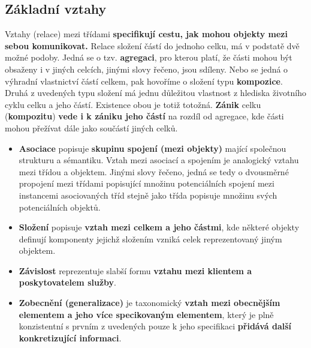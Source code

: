 \subsection{Základní vztahy}
Vztahy (relace) mezi třídami \textbf{specifikují cestu, jak mohou objekty mezi sebou komunikovat.} Relace složení částí do jednoho celku, má v podstatě dvě možné podoby.  Jedná se  o tzv. \textbf{agregaci}, pro kterou platí, že části mohou být obsaženy i v jiných celcích, jinými slovy řečeno, jsou sdíleny.  Nebo se jedná o výhradní vlastnictví částí celkem, pak hovoříme o  složení typu \textbf{kompozice}.  Druhá z uvedených typu složení má jednu důležitou vlastnost  z hlediska životního cyklu celku a jeho částí.  Existence obou je totiž totožná.  \textbf{Zánik} celku  (\textbf{kompozitu}) \textbf{vede i k zániku jeho částí} na rozdíl od agregace, kde části mohou přežívat dále jako součástí jiných celků.
\begin{itemize}
\item \textbf{Asociace} popisuje\textbf{ skupinu spojení (mezi objekty)} mající společnou strukturu a sémantiku. Vztah mezi asociací a spojením je analogický vztahu mezi třídou a objektem. Jinými slovy řečeno, jedná se tedy o dvousměrné propojení mezi třídami popisující množinu potenciálních spojení mezi instancemi asociovaných tříd stejně jako třída popisuje množinu svých potenciálních objektů.
\item \textbf{Složení} popisuje \textbf{vztah mezi celkem a jeho částmi}, kde některé objekty definují komponenty jejichž složením vzniká celek reprezentovaný jiným objektem.
\item \textbf{Závislost} reprezentuje slabší formu \textbf{vztahu mezi klientem a poskytovatelem služby}.
\item \textbf{Zobecnění (generalizace)} je taxonomický \textbf{vztah mezi obecnějším elementem a jeho více specikovaným elementem}, který je plně konzistentní s prvním z uvedených pouze k jeho specifikaci \textbf{přidává další konkretizující informaci}.
\end{itemize}

